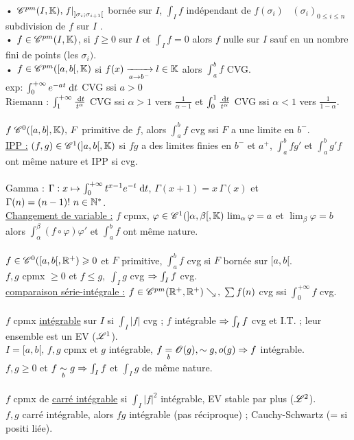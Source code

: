 \documentclass[12 pt]{exampleclass}
\begin{document}
• $\mathscr{C}^{pm}(I,\mathbb{K}), \left.f\right|_{]\sigma_i;\sigma_{i+1}[}$ bornée sur $I$, $\int_I f$ indépendant de $f(\sigma_i)$ \ $(\sigma_i)_{0\leqslant i \leqslant n}$ subdivision de $f$ sur $I$ .\\
• $f\in \mathscr{C}^{pm}(I,\mathbb{K})$, si $f\geqslant0$ sur $I$ et $\int_I f =0$ alors $f$ nulle sur $I$ sauf en un nombre fini de points (les $\sigma_i)$.\\
• $f\in\mathscr{C}^{pm}([a,b[,\mathbb{K})$ si $f(x)\xrightarrow[a\to b^-]{} l\in\mathbb{K}$ alors $\int_a^b f$ CVG.\\
exp: $\int_0^{+\infty} e^{-at} \; \text{d}t$ CVG ssi $a>0$\\
Riemann : $\int_1^{+\infty} \frac{\; \text{d}t}{t^\alpha}$ CVG ssi $\alpha>1$ vers $\frac{1}{\alpha -1}$ \; et $\int_0^1 \frac{\; \text{d}t}{t^\alpha}$ CVG ssi $\alpha<1$ vers $\frac{1}{1-\alpha}$.\\
\text{}\\
$f\; \mathscr{C}^0([a,b],\mathbb{K}), \, F$ primitive de $f$, alors $\int_a^b f$ cvg ssi $F$ a une limite en $b^-$.\\
\underline{IPP :} $(f,g)\in\mathscr{C}^1(]a,b[, \mathbb{K})$ si $fg$ a des limites finies en $b^-$ et $a^+$, $\int_a^b fg'$ et $\int_a^b g'f$ ont même nature et IPP si cvg.\\
\text{}\\
Gamma : $\Gamma : x\mapsto \int_0^{+\infty} t^{x-1}e^{-t} \; \text{d}t$, $\Gamma(x+1) = x\,\Gamma(x)$ et $\Gamma(n) = (n-1)! \ n\in\N^*$.\\
\underline{Changement de variable :} $f$ cpmx, $\varphi\in \mathscr{C}^1(]\alpha, \beta[,\mathbb{K}) \, \lim_\alpha \varphi = a$ et $\lim_\beta \varphi = b$ alors $\int_\alpha^\beta (f\circ \varphi) \varphi'$ et $\int_a^b f$ ont même nature.\\
\text{}\\
$f\in\mathscr{C}^0([a,b[,\mathbb{R}^+) \geqslant 0$ et $F$ primitive, $\int_a^b f$ cvg si $F$ bornée sur $[a,b[$.\\
$f,g$ cpmx $\geqslant 0$ et $f\leqslant g, \; \int_I g$ cvg $\Rightarrow \int_I f$ cvg.\\
\underline{comparaison série-intégrale :} $f\in\mathscr{C}^{pm}(\mathbb{R}^+,\mathbb{R}^+) \searrow\,, \; \sum f(n)$ cvg ssi $\int_0^{+\infty}f$ cvg.\\
\text{}\\
$f$ cpmx \underline{intégrable} sur $I$ si $\int_I |f|$ cvg ; $f$ intégrable $\Rightarrow \int_I f$ cvg et I.T. ; leur ensemble est un EV ($\mathscr{L}^1$).\\
$I=[a,b[, \, f,g$ cpmx et $g$ intégrable, $f\underset{b}{=} \mathscr{O}(g), \sim g, o(g) \Rightarrow f$ intégrable.\\
$f,g\geqslant0$ et $f\underset{b}{\sim} g \Rightarrow \int_I f$ et $\int_I g$ de même nature.\\
\text{}\\
$f$ cpmx de \underline{carré intégrable} si $\int_I|f|^2$ intégrable, EV stable par plus ($\mathscr{L}^2$).\\
$f,g$ carré intégrable, alors $fg$ intégrable (pas réciproque) ; Cauchy-Schwartz (= si positi liée).\\
\end{document}
